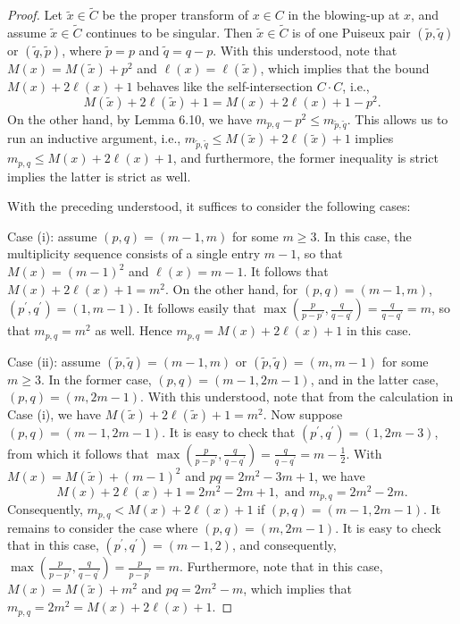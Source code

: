 \documentclass[11pt]{amsart}
\theoremstyle{plain}
\numberwithin{theorem}{section}
\theoremstyle{definition}
\begin{document}
\begin{proof}
Let $\tilde{x}\in \tilde{C}$ be the proper transform of $x\in C$ in the blowing-up at $x$, and assume $\tilde{x}\in \tilde{C}$ continues to be singular. Then $\tilde{x}\in \tilde{C}$ is of one Puiseux pair $(\tilde{p},\tilde{q})$
or $(\tilde{q},\tilde{p})$, where $\tilde{p}=p$ and $\tilde{q}=q-p$. With this understood, note that 
$M(x)=M(\tilde{x})+p^2$ and $\ell(x)=\ell(\tilde{x})$, which implies that the bound $M(x)+2\ell(x)+1$ behaves like the 
self-intersection $C\cdot C$, i.e., 
$$
M(\tilde{x})+2\ell(\tilde{x})+1=M(x)+2\ell(x)+1-p^2.
$$
On the other hand, by Lemma 6.10, we have $m_{p,q}-p^2\leq m_{\tilde{p},\tilde{q}}$. This allows us to run an inductive argument, i.e., $m_{\tilde{p},\tilde{q}}\leq M(\tilde{x})+2\ell(\tilde{x})+1$ implies 
$m_{p,q}\leq M(x)+2\ell(x)+1$, and furthermore, the former inequality is strict implies the latter is strict as well. 

With the preceding understood, it suffices to consider the following cases:

Case (i): assume $(p,q)=(m-1,m)$ for some $m\geq 3$. In this case, the multiplicity sequence consists of a single entry $m-1$, so that $M(x)=(m-1)^2$ and $\ell(x)=m-1$. It follows that $M(x)+ 2\ell(x)+1=m^2$. On the other hand,
for $(p,q)=(m-1,m)$, $(p^\prime,q^\prime)=(1,m-1)$. It follows easily that $\max (\frac{p}{p-p^\prime},\frac{q}{q-q^\prime})=\frac{q}{q-q^\prime}=m$, so that $m_{p,q}=m^2$ as well. Hence $m_{p,q}= M(x)+2\ell(x)+1$
in this case. 

Case (ii): assume $(\tilde{p},\tilde{q})=(m-1,m)$ or $(\tilde{p},\tilde{q})=(m,m-1)$ for some $m\geq 3$. In the former
case, $(p,q)=(m-1, 2m-1)$, and in the latter case, $(p,q)=(m,2m-1)$. With this understood, note that from the calculation in Case (i), we have $M(\tilde{x})+ 2\ell(\tilde{x})+1=m^2$. Now suppose $(p,q)=(m-1, 2m-1)$.
It is easy to check that $(p^\prime,q^\prime)=(1,2m-3)$, from which it follows that
$\max (\frac{p}{p-p^\prime},\frac{q}{q-q^\prime})=\frac{q}{q-q^\prime}=m-\frac{1}{2}$. With $M(x)=M(\tilde{x})+(m-1)^2$ and $pq=2m^2-3m+1$, we have 
$$
M(x)+2\ell(x)+1=2m^2-2m+1, \mbox{ and } m_{p,q}=2m^2-2m. 
$$
Consequently, $m_{p,q}< M(x)+2\ell(x)+1$ if $(p,q)=(m-1, 2m-1)$. It remains to consider the case where 
$(p,q)=(m,2m-1)$. It is easy to check that in this case, $(p^\prime,q^\prime)=(m-1, 2)$, and consequently, 
$\max (\frac{p}{p-p^\prime},\frac{q}{q-q^\prime})=\frac{p}{p-p^\prime}=m$. Furthermore, note that in this case,
$M(x)=M(\tilde{x})+m^2$ and $pq=2m^2-m$, which implies that $m_{p,q}=2m^2=M(x)+2\ell(x)+1$. 


\end{proof}
\end{document}
